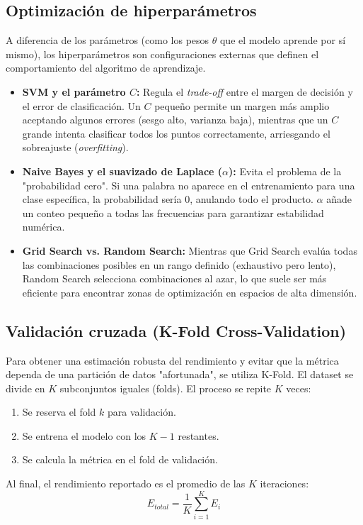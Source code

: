 \subsection{Optimización de hiperparámetros}

A diferencia de los parámetros (como los pesos $\theta$ que el modelo aprende por sí mismo), los hiperparámetros son configuraciones externas que definen el comportamiento del algoritmo de aprendizaje.

\begin{itemize}
\item \textbf{SVM y el parámetro $C$:} Regula el \textit{trade-off} entre el margen de decisión y el error de clasificación. Un $C$ pequeño permite un margen más amplio aceptando algunos errores (sesgo alto, varianza baja), mientras que un $C$ grande intenta clasificar todos los puntos correctamente, arriesgando el sobreajuste (\textit{overfitting}).

\item \textbf{Naive Bayes y el suavizado de Laplace ($\alpha$):} Evita el problema de la "probabilidad cero". Si una palabra no aparece en el entrenamiento para una clase específica, la probabilidad sería $0$, anulando todo el producto. $\alpha$ añade un conteo pequeño a todas las frecuencias para garantizar estabilidad numérica.

\item \textbf{Grid Search vs. Random Search:} Mientras que Grid Search evalúa todas las combinaciones posibles en un rango definido (exhaustivo pero lento), Random Search selecciona combinaciones al azar, lo que suele ser más eficiente para encontrar zonas de optimización en espacios de alta dimensión.
\end{itemize}

\subsection{Validación cruzada (K-Fold Cross-Validation)}
Para obtener una estimación robusta del rendimiento y evitar que la métrica dependa de una partición de datos "afortunada", se utiliza K-Fold. El dataset se divide en $K$ subconjuntos iguales (folds). 
El proceso se repite $K$ veces:\begin{enumerate}
\item Se reserva el fold $k$ para validación.
\item Se entrena el modelo con los $K-1$ restantes.
\item Se calcula la métrica en el fold de validación.
\end{enumerate}
Al final, el rendimiento reportado es el promedio de las $K$ iteraciones:$$E_{total} = \frac{1}{K} \sum_{i=1}^{K} E_i$$


